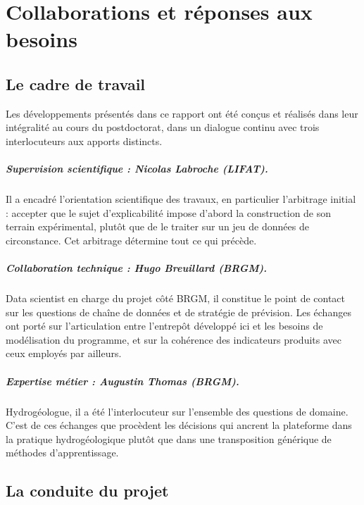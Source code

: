 \chapter{Collaborations et réponses aux besoins}
\label{ch:collaborations}


\section{Le cadre de travail}

Les développements présentés dans ce rapport ont été conçus et réalisés dans leur intégralité au
cours du postdoctorat, dans un dialogue continu avec trois interlocuteurs aux apports distincts.

\paragraph{Supervision scientifique : Nicolas Labroche (LIFAT).} Il a encadré l'orientation
scientifique des travaux, en particulier l'arbitrage
initial : accepter que le sujet d'explicabilité impose d'abord la construction de son terrain
expérimental, plutôt que de le traiter sur un jeu de données de circonstance. Cet arbitrage
détermine tout ce qui précède.

\paragraph{Collaboration technique : Hugo Breuillard (BRGM).} Data scientist en charge du projet
côté BRGM, il constitue le point de contact sur les questions de chaîne de données et de
stratégie de prévision. Les échanges ont porté sur l'articulation entre l'entrepôt développé ici
et les besoins de modélisation du programme, et sur la cohérence des indicateurs produits avec
ceux employés par ailleurs.

\paragraph{Expertise métier : Augustin Thomas (BRGM).} Hydrogéologue, il a été l'interlocuteur
sur l'ensemble des questions de domaine. C'est de ces échanges que procèdent les décisions qui
ancrent la plateforme dans la pratique hydrogéologique plutôt que dans une transposition
générique de méthodes d'apprentissage.

\section{La conduite du projet}

